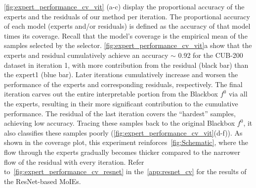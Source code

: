 \cref{fig:expert_performance_cv_vit} (a-c) display the proportional accuracy of the experts and the residuals of our method per iteration. The proportional accuracy of each model (experts and/or residuals) is defined as the accuracy of that model times its coverage. Recall that the model's coverage is the empirical mean of the samples selected by the selector. 
\cref{fig:expert_performance_cv_vit}a show that the experts and residual cumulatively achieve an accuracy $\sim$ 0.92 for the CUB-200 dataset in iteration 1, with more contribution from the residual (black bar) than the expert1 (blue bar). Later iterations cumulatively increase and worsen the performance of the experts and corresponding residuals, respectively. The final iteration carves out the entire interpretable portion from the Blackbox $f^0$ via all the experts, resulting in their more significant contribution to the cumulative performance. The residual of the last iteration covers the ``hardest'' samples, achieving low accuracy. Tracing these samples back to the original Blackbox $f^0$, it also classifies these samples poorly (\cref{fig:expert_performance_cv_vit}{(d-f)}).
As shown in the coverage plot, this experiment reinforces~\cref{fig:Schematic}, where the flow through the experts gradually becomes thicker compared to the narrower flow of the residual with every iteration. Refer to~\cref{fig:expert_performance_cv_resnet} in the~\cref{app:resnet_cv} for the results of the ResNet-based MoIEs.


